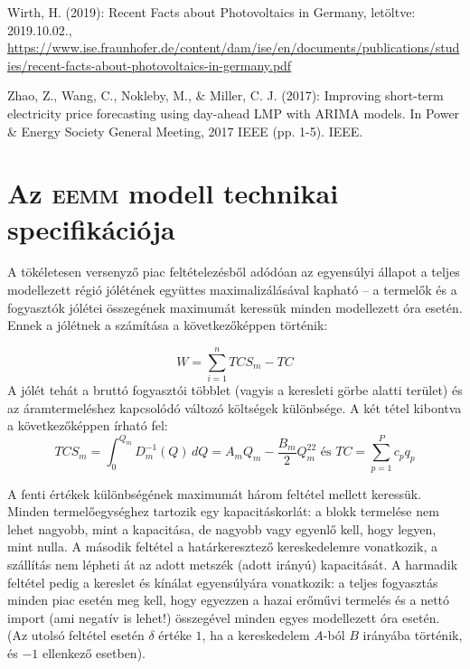 \documentclass[twoside, magyar, showtrims]{corvinusphd}
\begin{document}
\begin{thebibliography}{99}
Wirth, H. (2019): Recent Facts about Photovoltaics in Germany, letöltve: 2019.10.02.,
\url{https://www.ise.fraunhofer.de/content/dam/ise/en/documents/publications/studies/recent-facts-about-photovoltaics-in-germany.pdf}

Zhao, Z., Wang, C., Nokleby, M., \& Miller, C. J. (2017): Improving short-term electricity price forecasting using day-ahead LMP with ARIMA models. In Power \& Energy Society General Meeting, 2017 IEEE (pp. 1-5). IEEE.
\end{thebibliography}

\backmatter
\renewcommand{\appendixpagename}{Függelékek}
\renewcommand{\appendixtocname}{\appendixpagename}
\appendix
\appendixpage
\renewcommand{\chaptername}{\appendixname}
\chapter{Az \textsc{eemm} modell technikai specifikációja}\label{app:1}

\scwords A tökéletesen versenyző piac feltételezésből adódóan az egyensúlyi állapot a teljes modellezett
régió jólétének együttes maximalizálásával kapható – a termelők és a fogyasztók jólétei összegének
maximumát keressük minden modellezett óra esetén.
Ennek a jólétnek a számítása a következőképpen történik:

\[
    W=
    \sum_{i=1}^nTCS_m-TC
\]
A jólét tehát a bruttó fogyasztói többlet (vagyis a keresleti görbe alatti terület) és az áramtermeléshez
kapcsolódó változó költségek különbsége.
A két tétel kibontva a következőképpen írható fel:
\[
    TCS_m=
    \int_0^{Q_m}D_m^{-1}(Q)\,dQ=A_mQ_m-\frac{B_m}{2}Q_m^22\mbox{ és }
    TC=\sum_{p=1}^Pc_pq_p
\]

A fenti értékek különbségének maximumát három feltétel mellett keressük.
Minden termelőegységhez
tartozik egy kapacitáskorlát: a blokk termelése nem lehet nagyobb,
mint a kapacitása,
de nagyobb
vagy egyenlő kell, hogy legyen, mint nulla.
A második feltétel a határkeresztező kereskedelemre vonatkozik,
a szállítás nem lépheti át az adott metszék (adott irányú) kapacitását.
A harmadik feltétel pedig
a kereslet és kínálat egyensúlyára vonatkozik: a teljes fogyasztás minden piac esetén meg kell,
hogy egyezzen a hazai erőművi termelés és a nettó import (ami negatív is lehet!) összegével
minden egyes modellezett óra esetén.
(Az utolsó feltétel esetén $\delta$ értéke $1$, ha a kereskedelem $A$-ból $B$ irányába történik,
és $-1$ ellenkező esetben).
\end{document}
